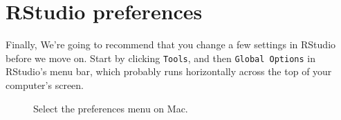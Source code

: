 \documentclass[
  letterpaper,
  DIV=11,
  numbers=noendperiod]{scrreprt}
\begin{document}
\section{RStudio preferences}\label{rstudio-preferences}

Finally, We're going to recommend that you change a few settings in
RStudio before we move on. Start by clicking \texttt{Tools}, and then
\texttt{Global\ Options} in RStudio's menu bar, which probably runs
horizontally across the top of your computer's screen.

\begin{figure}


\caption{\label{fig-preferences1}Select the preferences menu on Mac.}

\end{figure}%
\end{document}
